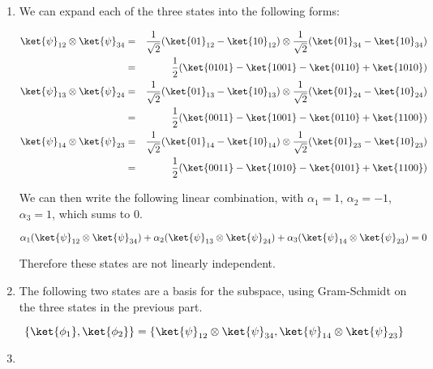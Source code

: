 \documentclass[12pt]{article}
\begin{document}
\begin{enumerate}


\item %
We can expand each of the three states into the following forms:

\begin{eqnarray*}
\ket{\psi}_{12}\otimes\ket{\psi}_{34} & = & \normtwo(\ket{01}_{12}-\ket{10}_{12}) \otimes \normtwo(\ket{01}_{34}-\ket{10}_{34})\\
 & = & \frac{1}{2}(\ket{0101} - \ket{1001} - \ket{0110} + \ket{1010})\\
\ket{\psi}_{13}\otimes\ket{\psi}_{24} & = & \normtwo(\ket{01}_{13}-\ket{10}_{13}) \otimes \normtwo(\ket{01}_{24}-\ket{10}_{24})\\
 & = & \frac{1}{2}(\ket{0011} - \ket{1001} - \ket{0110} + \ket{1100})\\
\ket{\psi}_{14}\otimes\ket{\psi}_{23} & = & \normtwo(\ket{01}_{14}-\ket{10}_{14}) \otimes \normtwo(\ket{01}_{23}-\ket{10}_{23})\\
 & = & \frac{1}{2}(\ket{0011} - \ket{1010} - \ket{0101} + \ket{1100})
\end{eqnarray*}

We can then write the following linear combination, with
$\alpha_1 = 1$, $\alpha_2 = -1$, $\alpha_3 = 1$,  which sums to 0.

\begin{displaymath}
\alpha_1(\ket{\psi}_{12}\otimes\ket{\psi}_{34}) +
\alpha_2(\ket{\psi}_{13}\otimes\ket{\psi}_{24}) +
\alpha_3(\ket{\psi}_{14}\otimes\ket{\psi}_{23}) = 0
\end{displaymath}

Therefore these states are not linearly independent.

\item %
The following two states are a basis for the subspace, using Gram-Schmidt
on the three states in the previous part.

\begin{displaymath}
\{\ket{\phi_1}, \ket{\phi_2}\} = \{\ket{\psi}_{12}\otimes\ket{\psi}_{34},
\ket{\psi}_{14}\otimes\ket{\psi}_{23}\}
\end{displaymath}

\item %

\end{enumerate}
\end{document}
